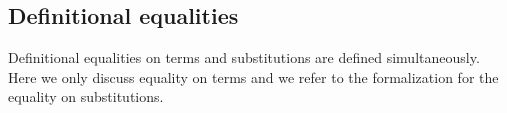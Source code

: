 \subsection{Definitional equalities}
\label{sec:defeq}

Definitional equalities on terms and substitutions are defined simultaneously.
Here we only discuss equality on terms and we refer to the formalization for the equality on substitutions.
\begin{AgdaAlign}
\begin{code}%
\>[0][@{}l@{\AgdaIndent{1}}]%
\>[2]\AgdaSpace{}%
\AgdaSpace{}%
\AgdaSymbol{:}\AgdaSpace{}%
\AgdaSpace{}%
\AgdaSymbol{\{}\AgdaSymbol{\}}\AgdaSpace{}%
\AgdaSymbol{\{}\AgdaSpace{}%
\AgdaSymbol{:}\AgdaSpace{}%
\AgdaSpace{}%
\AgdaSymbol{\}}\AgdaSpace{}%
\AgdaSymbol{\{}\AgdaSpace{}%
\AgdaSymbol{:}\AgdaSpace{}%
\AgdaSpace{}%
\AgdaSymbol{\}}\AgdaSpace{}%
\AgdaSpace{}%
\AgdaSpace{}%
\AgdaSpace{}%
\AgdaSpace{}%
\AgdaSpace{}%
\AgdaSpace{}%
\AgdaSpace{}%
\AgdaSpace{}%
\AgdaSpace{}%
\AgdaSpace{}%
\<%
\end{code}


\end{AgdaAlign}

